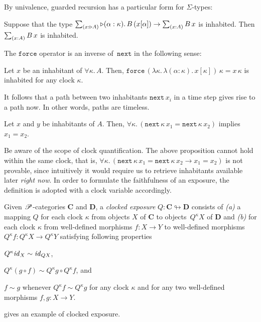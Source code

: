 \documentclass[a4paper,UKenglish,numberwithinsect,cleveref,thm-restate]{lipics-v2021}
\numberwithin{equation}{section}
\theoremstyle{plain}
\begin{document}
By univalence, guarded recursion has a particular form for $\Sigma$-types:
\begin{corollary} \label{coro:lob-induction-sum}
  Suppose that the type $\sm{x : \laterp A} \laterp (\alpha : \kappa).\,B\,(x[\alpha]) \to \sm{x : A} B\,x$ is inhabited.
  Then $\sm{x : A} B\,x$ is inhabited.
\end{corollary}

The $\mathtt{force}$ operator is an inverse of~$\mathtt{next}$ in the following sense:
\begin{lemma}
  Let $x$ be an inhabitant of $\forall \kappa.\, A$. Then, 
  $\mathtt{force}\,(\lambda \kappa.\,\lambda (\alpha : \kappa).\, x [\kappa])\,\kappa = x\,\kappa$ is inhabited for any clock $\kappa$.
\end{lemma}

It follows that a path between two inhabitants $\mathtt{next}\,x_i$ in a time step gives rise to a path now.
In other words, paths are timeless.
\begin{proposition}\label{lem:later-identity}
  Let $x$ and $y$ be inhabitants of $A$. Then, $\forall \kappa.\, \left(\mathtt{next}\,\kappa\,x_1 = \mathtt{next}\,\kappa\,x_2\right)$ implies $x_1 = x_2$.
\end{proposition}
Be aware of the scope of clock quantification.
The above proposition cannot hold within the same clock, that is, $\forall \kappa.\, \left(\mathtt{next}\,\kappa\,x_1 = \mathtt{next}\,\kappa\,x_2 \to x_1 =x_2\right)$ is not provable, since intuitively it would require us to retrieve inhabitants available later \emph{right now}.
In order to formulate the faithfulness of an exposure, the definition is adopted with a clock variable accordingly.
\begin{definition}
  Given $\mathscr{P}$-categories $\mathbf{C}$ and $\mathbf{D}$, a \emph{clocked exposure} $Q\colon \mathbf{C} \looparrowright \mathbf{D}$ consists of \emph{(a)} a mapping $Q$ for each clock $\kappa$ from objects $X$ of $\mathbf{C}$ to objects~$Q^\kappa X$ of $\mathbf{D}$ and \emph{(b)} for each clock $\kappa$ from well-defined morphisms $f\colon X \to Y$ to well-defined morphisms $Q^\kappa f\colon Q^\kappa X \to Q^\kappa Y$ satisfying following properties
  \begin{romanenumerate}
    \item $Q^\kappa \mathit{id}_X \sim \mathit{id}_{QX}$,
    \item $Q^\kappa (g \circ f) \sim Q^\kappa g \circ Q^\kappa f$, and
    \item $f \sim g$ whenever $Q^\kappa f \sim Q^\kappa g$ for any clock $\kappa$ and for any two well-defined morphisms $f, g\colon X \to Y$. 
  \end{romanenumerate}
\end{definition}
 gives an example of clocked exposure.
\end{document}
